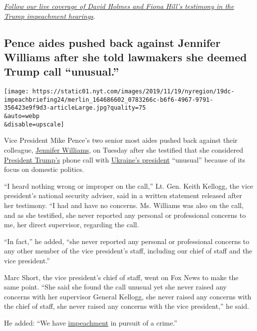 \href{https://www.nytimes.com/2019/11/21/us/politics/impeachment-hearing.html}{\emph{Follow
our live coverage of David Holmes and Fiona Hill's testimony in the
Trump impeachment hearings}}.

\hypertarget{pence-aides-pushed-back-against-jennifer-williams-after-she-told-lawmakers-she-deemed-trump-call-unusual}{%
\subsection{Pence aides pushed back against Jennifer Williams after she
told lawmakers she deemed Trump call
``unusual.''}\label{pence-aides-pushed-back-against-jennifer-williams-after-she-told-lawmakers-she-deemed-trump-call-unusual}}

\texttt{[image: https://static01.nyt.com/images/2019/11/19/nyregion/19dc-impeachbriefing24/merlin\_164686602\_0783266c-b6f6-4967-9791-356423e9f9d3-articleLarge.jpg?quality=75\\\&auto=webp\\\&disable=upscale]}

Vice President Mike Pence's two senior most aides pushed back against
their colleague,
\href{https://www.nytimes.com/2019/11/19/us/politics/jennifer-williams.html}{Jennifer
Williams}, on Tuesday after she testified that she considered
\href{https://www.nytimes.com/2019/11/20/us/politics/impeachment-hearings.html}{President
Trump's} phone call with
\href{https://www.nytimes.com/2019/11/20/us/politics/impeachment-hearings.html}{Ukraine's
president} ``unusual'' because of its focus on domestic politics.

``I heard nothing wrong or improper on the call,'' Lt. Gen. Keith
Kellogg, the vice president's national security adviser, said in a
written statement released after her testimony. ``I had and have no
concerns. Ms. Williams was also on the call, and as she testified, she
never reported any personal or professional concerns to me, her direct
supervisor, regarding the call.

``In fact,'' he added, ``she never reported any personal or professional
concerns to any other member of the vice president's staff, including
our chief of staff and the vice president.''

Marc Short, the vice president's chief of staff, went on Fox News to
make the same point. ``She said she found the call unusual yet she never
raised any concerns with her supervisor General Kellogg, she never
raised any concerns with the chief of staff, she never raised any
concerns with the vice president,'' he said.

He added: ``We have
\href{https://www.nytimes.com/2019/11/20/us/politics/impeachment-hearings.html}{impeachment}
in pursuit of a crime.''

